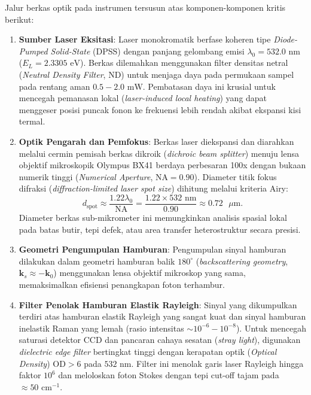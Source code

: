 Jalur berkas optik pada instrumen tersusun atas komponen-komponen kritis berikut:
\begin{enumerate}
    \item \textbf{Sumber Laser Eksitasi}: Laser monokromatik berfase koheren tipe \textit{Diode-Pumped Solid-State} (DPSS) dengan panjang gelombang emisi $\lambda_0 = 532.0\text{ nm}$ ($E_L = 2.3305\text{ eV}$). Berkas dilemahkan menggunakan filter densitas netral (\textit{Neutral Density Filter}, ND) untuk menjaga daya pada permukaan sampel pada rentang aman $0.5 - 2.0\text{ mW}$. Pembatasan daya ini krusial untuk mencegah pemanasan lokal (\textit{laser-induced local heating}) yang dapat menggeser posisi puncak fonon ke frekuensi lebih rendah akibat ekspansi kisi termal.
    \item \textbf{Optik Pengarah dan Pemfokus}: Berkas laser diekspansi dan diarahkan melalui cermin pemisah berkas dikroik (\textit{dichroic beam splitter}) menuju lensa objektif mikroskopik Olympus BX41 berdaya perbesaran 100x dengan bukaan numerik tinggi (\textit{Numerical Aperture}, $\text{NA} = 0.90$). Diameter titik fokus difraksi (\textit{diffraction-limited laser spot size}) dihitung melalui kriteria Airy:
    \begin{equation}
    d_{\mathrm{spot}} \approx \frac{1.22 \lambda_0}{\mathrm{NA}} = \frac{1.22 \times 532\text{ nm}}{0.90} \approx 0.72\text{ }\mu\text{m}.
    \label{eq:spot_size}
    \end{equation}
    Diameter berkas sub-mikrometer ini memungkinkan analisis spasial lokal pada batas butir, tepi defek, atau area transfer heterostruktur secara presisi.
    \item \textbf{Geometri Pengumpulan Hamburan}: Pengumpulan sinyal hamburan dilakukan dalam geometri hamburan balik $180^\circ$ (\textit{backscattering geometry}, $\mathbf{k}_s \approx -\mathbf{k}_0$) menggunakan lensa objektif mikroskop yang sama, memaksimalkan efisiensi penangkapan foton terhambur.
    \item \textbf{Filter Penolak Hamburan Elastik Rayleigh}: Sinyal yang dikumpulkan terdiri atas hamburan elastik Rayleigh yang sangat kuat dan sinyal hamburan inelastik Raman yang lemah (rasio intensitas $\sim 10^{-6} - 10^{-8}$). Untuk mencegah saturasi detektor CCD dan pancaran cahaya sesatan (\textit{stray light}), digunakan \textit{dielectric edge filter} bertingkat tinggi dengan kerapatan optik (\textit{Optical Density}) $\text{OD} > 6$ pada $532\text{ nm}$. Filter ini menolak garis laser Rayleigh hingga faktor $10^6$ dan meloloskan foton Stokes dengan tepi cut-off tajam pada $\approx 50\text{ cm}^{-1}$.

\end{enumerate}

